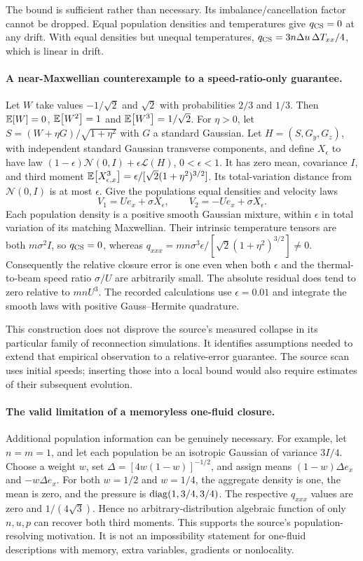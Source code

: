 The bound is sufficient rather than necessary. Its imbalance/cancellation
factor cannot be dropped. Equal population densities and temperatures give
$q_{\rm CS}=0$ at any drift. With equal densities but unequal temperatures,
$q_{\rm CS}=3n\Delta u\,\Delta T_{xx}/4$, which is linear in drift.

\paragraph{A near-Maxwellian counterexample to a speed-ratio-only guarantee.}
Let $W$ take values $-1/\sqrt2$ and $\sqrt2$ with probabilities $2/3$ and $1/3$.
Then $\mathbb E\!\left[W\right]=0$, $\mathbb E\!\left[W^2\right]=1$ and $\mathbb E\!\left[W^3\right]=1/\sqrt2$.
For $\eta>0$, let $S=(W+\eta G)/\sqrt{1+\eta^2}$ with $G$ a standard Gaussian.
Let $H=(S,G_y,G_z)$, with independent standard Gaussian transverse components,
and define $X_\epsilon$ to have law
$(1-\epsilon)\mathcal N(0,I)+\epsilon\mathcal L(H)$, $0<\epsilon<1$.
It has zero mean, covariance $I$, and third moment
$\mathbb E\!\left[X_{\epsilon,x}^3\right]=\epsilon/[\sqrt2(1+\eta^2)^{3/2}]$.
Its total-variation distance from $\mathcal N(0,I)$ is at most $\epsilon$.
Give the populations equal densities and velocity laws
\begin{equation}
 V_1=Ue_x+\sigma X_\epsilon,\qquad
 V_2=-Ue_x+\sigma X_\epsilon.
 \label{eq:smooth-skew-mixtures}
\end{equation}
Each population density is a positive smooth Gaussian mixture, within
$\epsilon$ in total variation of its matching Maxwellian. Their intrinsic
temperature tensors are both $m\sigma^2I$, so
$q_{\rm CS}=0$, whereas
$q_{xxx}=mn\sigma^3\epsilon/[\sqrt2(1+\eta^2)^{3/2}]\ne0$.
Consequently the relative closure error is one even when both $\epsilon$ and
the thermal-to-beam speed ratio $\sigma/U$ are arbitrarily small.
The absolute residual does tend to zero relative to $mnU^3$.
The recorded calculations use $\epsilon=0.01$ and integrate the smooth
laws with positive Gauss--Hermite quadrature.

This construction does not disprove the source's measured collapse in its
particular family of reconnection simulations. It identifies assumptions
needed to extend that empirical observation to a relative-error guarantee.
The source scan uses initial speeds; inserting those into a local bound would
also require estimates of their subsequent evolution.

\paragraph{The valid limitation of a memoryless one-fluid closure.}
Additional population information can be genuinely necessary. For example,
let $n=m=1$, and let each population be an isotropic Gaussian of variance
$3I/4$. Choose a weight $w$, set
$\Delta=[4w(1-w)]^{-1/2}$, and assign means
$(1-w)\Delta e_x$ and $-w\Delta e_x$.
For both $w=1/2$ and $w=1/4$, the aggregate density is one, the mean is zero,
and the pressure is $\operatorname{diag}(1,3/4,3/4)$. The respective $q_{xxx}$ values are
zero and $1/(4\sqrt3)$. Hence no arbitrary-distribution algebraic function
of only $n,u,p$ can recover both third moments. This supports the source's
population-resolving motivation. It is not an impossibility statement for
one-fluid descriptions with memory, extra variables, gradients or nonlocality.
